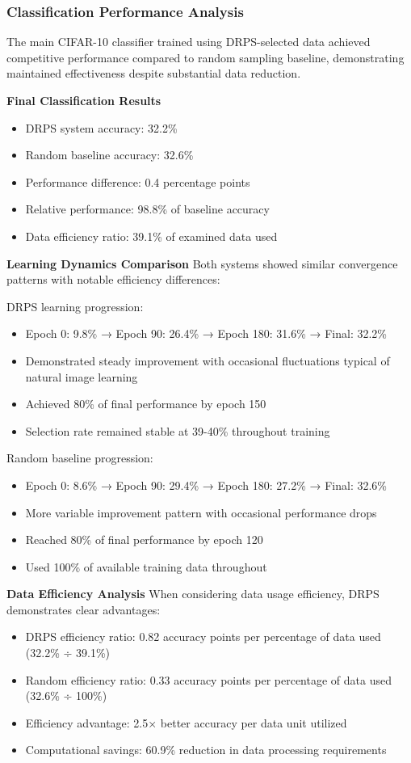 \documentclass[12pt]{article}
\begin{document}
\subsubsection{Classification Performance Analysis}\label{performance-analysis}

The main CIFAR-10 classifier trained using DRPS-selected data achieved competitive performance compared to random sampling baseline, demonstrating maintained effectiveness despite substantial data reduction.

\textbf{Final Classification Results}
\begin{itemize}
\item DRPS system accuracy: 32.2\%
\item Random baseline accuracy: 32.6\%
\item Performance difference: 0.4 percentage points
\item Relative performance: 98.8\% of baseline accuracy
\item Data efficiency ratio: 39.1\% of examined data used
\end{itemize}

\textbf{Learning Dynamics Comparison}
Both systems showed similar convergence patterns with notable efficiency differences:

DRPS learning progression:
\begin{itemize}
\item Epoch 0: 9.8\% → Epoch 90: 26.4\% → Epoch 180: 31.6\% → Final: 32.2\%
\item Demonstrated steady improvement with occasional fluctuations typical of natural image learning
\item Achieved 80\% of final performance by epoch 150
\item Selection rate remained stable at 39-40\% throughout training
\end{itemize}

Random baseline progression:
\begin{itemize}
\item Epoch 0: 8.6\% → Epoch 90: 29.4\% → Epoch 180: 27.2\% → Final: 32.6\%
\item More variable improvement pattern with occasional performance drops
\item Reached 80\% of final performance by epoch 120
\item Used 100\% of available training data throughout
\end{itemize}

\textbf{Data Efficiency Analysis}
When considering data usage efficiency, DRPS demonstrates clear advantages:
\begin{itemize}
\item DRPS efficiency ratio: 0.82 accuracy points per percentage of data used (32.2\% ÷ 39.1\%)
\item Random efficiency ratio: 0.33 accuracy points per percentage of data used (32.6\% ÷ 100\%)
\item Efficiency advantage: 2.5× better accuracy per data unit utilized
\item Computational savings: 60.9\% reduction in data processing requirements
\end{itemize}
\end{document}
